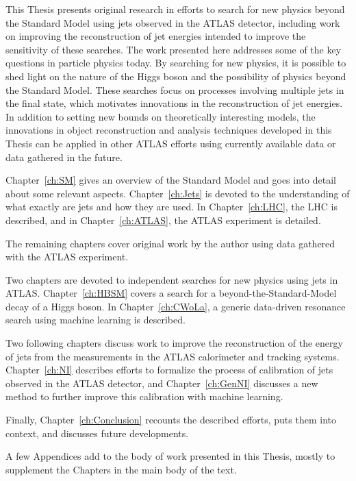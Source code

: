 This Thesis presents original research in efforts to search for new physics beyond the Standard Model using jets observed in the ATLAS detector, including work on improving the reconstruction of jet energies intended to improve the sensitivity of these searches.
The work presented here addresses some of the key questions in particle physics today.
By searching for new physics, it is possible to shed light on the nature of the Higgs boson and the possibility of physics beyond the Standard Model. 
These searches focus on processes involving multiple jets in the final state, which motivates innovations in the reconstruction of jet energies.
In addition to setting new bounds on theoretically interesting models,
the innovations in object reconstruction and analysis techniques developed in this Thesis can be applied in other ATLAS efforts using currently available data or data gathered in the future.

Chapter~\ref{ch:SM} gives an overview of the Standard Model and goes into detail about some relevant aspects.
Chapter~\ref{ch:Jets} is devoted to the understanding of what exactly are jets and how they are used.
In Chapter~\ref{ch:LHC}, the LHC is described, and in Chapter~\ref{ch:ATLAS}, the ATLAS experiment is detailed.

The remaining chapters cover original work by the author using data gathered with the ATLAS experiment.

Two chapters are devoted to independent searches for new physics using jets in ATLAS.
Chapter~\ref{ch:HBSM} covers a search for a beyond-the-Standard-Model decay of a Higgs boson.
In Chapter~\ref{ch:CWoLa}, a generic data-driven resonance search using machine learning is described.

Two following chapters discuss work to improve the reconstruction of the energy of jets from the measurements in the ATLAS calorimeter and tracking systems.
Chapter~\ref{ch:NI} describes efforts to formalize the process of calibration of jets observed in the ATLAS detector, and Chapter~\ref{ch:GenNI} discusses a new method to further improve this calibration with machine learning.

Finally, Chapter~\ref{ch:Conclusion} recounts the described efforts, puts them into context, and discusses future developments.

A few Appendices add to the body of work presented in this Thesis, mostly to supplement the Chapters in the main body of the text.

